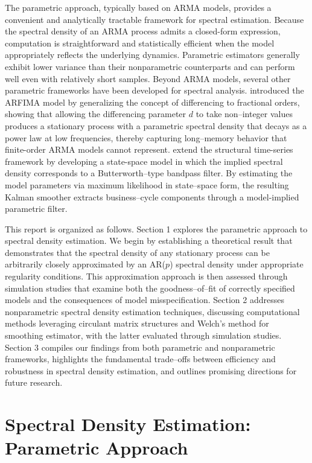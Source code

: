 \documentclass[preprint]{aastex}
\theoremstyle{nonitalicname}
\theoremstyle{plain}
\theoremstyle{remark}
\begin{document}
The parametric approach, typically based on ARMA models, provides a convenient and analytically tractable framework for spectral estimation. Because the spectral density of an ARMA process admits a closed-form expression, computation is straightforward and statistically efficient when the model appropriately reflects the underlying dynamics. Parametric estimators generally exhibit lower variance than their nonparametric counterparts and can perform well even with relatively short samples. Beyond ARMA models, several other parametric frameworks have been developed for spectral analysis. \cite{granger} introduced the ARFIMA model by generalizing the concept of differencing to fractional orders, showing that allowing the differencing parameter $d$ to take non--integer values produces a stationary process with a parametric spectral density that decays as a power law at low frequencies, thereby capturing long--memory behavior that finite-order ARMA models cannot represent. \cite{harvey} extend the structural time-series framework by developing a state-space model in which the implied spectral density corresponds to a Butterworth--type bandpass filter. By estimating the model parameters via maximum likelihood in state--space form, the resulting Kalman smoother extracts business--cycle components through a model-implied parametric filter.

This report is organized as follows. Section 1 explores the parametric approach to spectral density estimation. We begin by establishing a theoretical result that demonstrates that the spectral density of any stationary process can be arbitrarily closely approximated by an AR($p$) spectral density under appropriate regularity conditions. This approximation approach is then assessed through simulation studies that examine both the goodness--of--fit of correctly specified models and the consequences of model misspecification. Section 2 addresses nonparametric spectral density estimation techniques, discussing computational methods leveraging circulant matrix structures and Welch's method for smoothing estimator, with the latter evaluated through simulation studies. Section 3 compiles our findings from both parametric and nonparametric frameworks, highlights the fundamental trade--offs between efficiency and robustness in spectral density estimation, and outlines promising directions for future research.


\section{Spectral Density Estimation: Parametric Approach}
\end{document}

